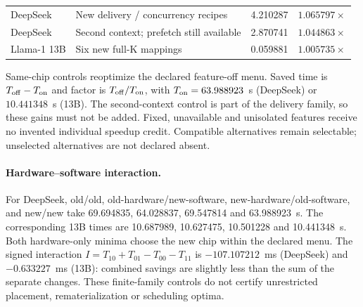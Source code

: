 \begin{table}[H]
\begin{tabular}{@{}llrr@{}}
DeepSeek & New delivery / concurrency recipes & 4.210287 & $1.065797\times$ \\
DeepSeek & Second context; prefetch still available & 2.870741 & $1.044863\times$ \\
Llama-1 13B & Six new full-K mappings & 0.059881 & $1.005735\times$ \\
\bottomrule
\end{tabular}
\par\smallskip\begin{minipage}{\linewidth}\footnotesize
Same-chip controls reoptimize the declared feature-off menu. Saved time is
$T_{\rm off}-T_{\rm on}$ and factor is $T_{\rm off}/T_{\rm on}$, with
$T_{\rm on}=63.988923$~s (DeepSeek) or $10.441348$~s (13B).
The second-context control is part of the delivery family, so these gains
must not be added. Fixed, unavailable and unisolated features receive no
invented individual speedup credit. Compatible alternatives remain selectable;
unselected alternatives are not declared absent.
\end{minipage}
\end{table}

\paragraph{Hardware--software interaction.}
For DeepSeek, old/old, old-hardware/new-software, new-hardware/old-software,
and new/new take 69.694835, 64.028837, 69.547814 and 63.988923~s.
The corresponding 13B times are 10.687989, 10.627475, 10.501228 and
10.441348~s. Both hardware-only minima choose the new chip within the
declared menu. The signed interaction
$I=T_{10}+T_{01}-T_{00}-T_{11}$ is $-107.107212$~ms (DeepSeek) and
$-0.633227$~ms (13B): combined savings are slightly less than the sum of the
separate changes. These finite-family controls do not certify unrestricted
placement, rematerialization or scheduling optima.
